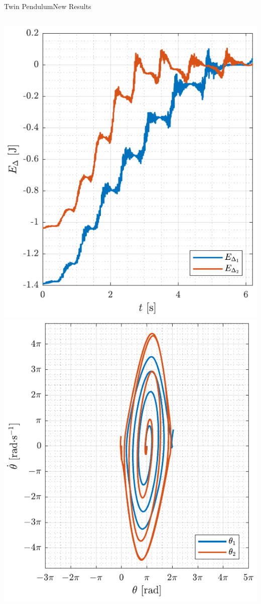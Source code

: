 \begin{frame}{Twin Pendulum}{New Results}
  \begin{columns}[c]\vspace{-12pt}
      \includegraphics[width=.95\textwidth]{figures/EdeltaSlidingModeCatchAttempt}
      \includegraphics[width=.95\textwidth]{figures/phaseSlidingModeCatchAttempt}

\end{columns}
\end{frame}
